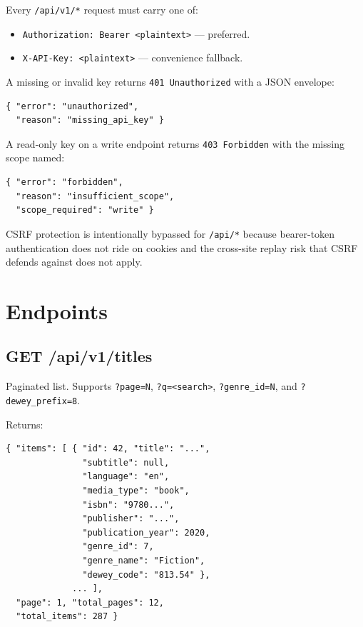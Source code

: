 Every \texttt{/api/v1/*} request must carry one of:

\begin{itemize}
  \item \texttt{Authorization: Bearer <plaintext>} — preferred.
  \item \texttt{X-API-Key: <plaintext>} — convenience fallback.
\end{itemize}

A missing or invalid key returns \texttt{401 Unauthorized} with
a JSON envelope:

\begin{verbatim}
{ "error": "unauthorized",
  "reason": "missing_api_key" }
\end{verbatim}

A read-only key on a write endpoint returns \texttt{403
Forbidden} with the missing scope named:

\begin{verbatim}
{ "error": "forbidden",
  "reason": "insufficient_scope",
  "scope_required": "write" }
\end{verbatim}

CSRF protection is intentionally bypassed for \texttt{/api/*}
because bearer-token authentication does not ride on cookies and
the cross-site replay risk that CSRF defends against does not
apply.

\section{Endpoints}

\subsection{GET /api/v1/titles}

Paginated list. Supports \texttt{?page=N},
\texttt{?q=<search>}, \texttt{?genre\_id=N}, and
\texttt{?dewey\_prefix=8}.

Returns:

\begin{verbatim}
{ "items": [ { "id": 42, "title": "...",
               "subtitle": null,
               "language": "en",
               "media_type": "book",
               "isbn": "9780...",
               "publisher": "...",
               "publication_year": 2020,
               "genre_id": 7,
               "genre_name": "Fiction",
               "dewey_code": "813.54" },
             ... ],
  "page": 1, "total_pages": 12,
  "total_items": 287 }
\end{verbatim}

